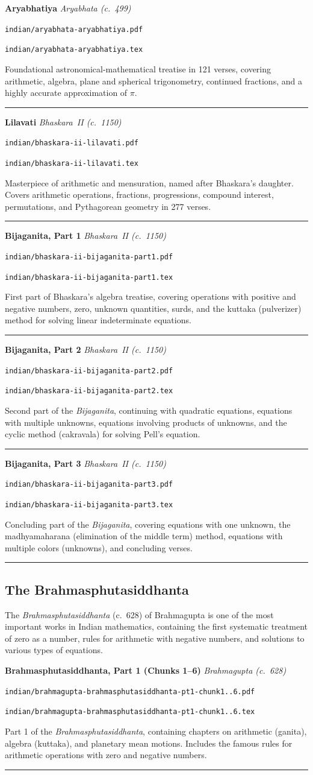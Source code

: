 \documentclass[11pt,a4paper]{article}
\newcommand{\workitem}[5]{%
  \par\smallskip
  \noindent\textbf{\large #1} \hfill \textit{#2}\par
  \noindent\texttt{\small #3}\par
  \noindent\texttt{\small #4}\par
  \noindent #5\par
  \smallskip\noindent\rule{\textwidth}{0.2pt}
}
\begin{document}
\workitem
  {Aryabhatiya}
  {Aryabhata (c.~499)}
  {indian/aryabhata-aryabhatiya.pdf}
  {indian/aryabhata-aryabhatiya.tex}
  {Foundational astronomical-mathematical treatise in 121 verses, covering arithmetic, algebra, plane and spherical trigonometry, continued fractions, and a highly accurate approximation of $\pi$.}

\workitem
  {Lilavati}
  {Bhaskara~II (c.~1150)}
  {indian/bhaskara-ii-lilavati.pdf}
  {indian/bhaskara-ii-lilavati.tex}
  {Masterpiece of arithmetic and mensuration, named after Bhaskara's daughter. Covers arithmetic operations, fractions, progressions, compound interest, permutations, and Pythagorean geometry in 277 verses.}

\workitem
  {Bijaganita, Part 1}
  {Bhaskara~II (c.~1150)}
  {indian/bhaskara-ii-bijaganita-part1.pdf}
  {indian/bhaskara-ii-bijaganita-part1.tex}
  {First part of Bhaskara's algebra treatise, covering operations with positive and negative numbers, zero, unknown quantities, surds, and the kuttaka (pulverizer) method for solving linear indeterminate equations.}

\workitem
  {Bijaganita, Part 2}
  {Bhaskara~II (c.~1150)}
  {indian/bhaskara-ii-bijaganita-part2.pdf}
  {indian/bhaskara-ii-bijaganita-part2.tex}
  {Second part of the \textit{Bijaganita}, continuing with quadratic equations, equations with multiple unknowns, equations involving products of unknowns, and the cyclic method (cakravala) for solving Pell's equation.}

\workitem
  {Bijaganita, Part 3}
  {Bhaskara~II (c.~1150)}
  {indian/bhaskara-ii-bijaganita-part3.pdf}
  {indian/bhaskara-ii-bijaganita-part3.tex}
  {Concluding part of the \textit{Bijaganita}, covering equations with one unknown, the madhyamaharana (elimination of the middle term) method, equations with multiple colors (unknowns), and concluding verses.}

\subsection*{The Brahmasphutasiddhanta}

The \textit{Brahmasphutasiddhanta} (c.~628) of Brahmagupta is one of the most important works in Indian mathematics, containing the first systematic treatment of zero as a number, rules for arithmetic with negative numbers, and solutions to various types of equations.

\workitem
  {Brahmasphutasiddhanta, Part 1 (Chunks 1--6)}
  {Brahmagupta (c.~628)}
  {indian/brahmagupta-brahmasphutasiddhanta-pt1-chunk1..6.pdf}
  {indian/brahmagupta-brahmasphutasiddhanta-pt1-chunk1..6.tex}
  {Part 1 of the \textit{Brahmasphutasiddhanta}, containing chapters on arithmetic (ganita), algebra (kuttaka), and planetary mean motions. Includes the famous rules for arithmetic operations with zero and negative numbers.}
\end{document}
